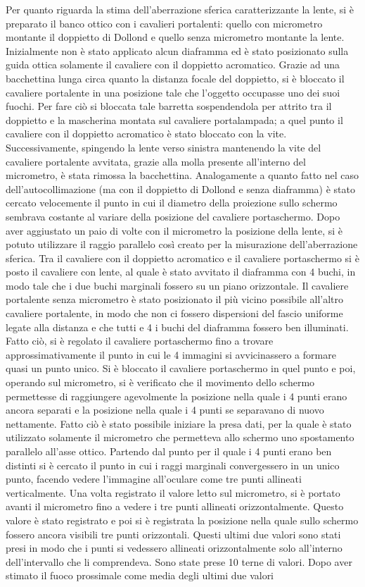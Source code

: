 Per quanto riguarda la stima dell'aberrazione sferica caratterizzante la lente, si è preparato il banco ottico con i cavalieri portalenti: quello con micrometro montante il doppietto di Dollond e quello senza micrometro montante la lente. Inizialmente non è stato applicato alcun diaframma ed è stato posizionato sulla guida ottica solamente il cavaliere con il doppietto acromatico. Grazie ad una bacchettina lunga circa quanto la distanza focale del doppietto, si è bloccato il cavaliere portalente in una posizione tale che l'oggetto occupasse uno dei suoi fuochi. Per fare ciò si bloccata tale barretta sospendendola per attrito tra il doppietto e la mascherina montata sul cavaliere portalampada; a quel punto il cavaliere con il doppietto acromatico è stato bloccato con la vite. Successivamente, spingendo la lente verso sinistra mantenendo la vite del cavaliere portalente avvitata, grazie alla molla presente all'interno del micrometro, è stata rimossa la bacchettina. Analogamente a quanto fatto nel caso dell'autocollimazione (ma con il doppietto di Dollond e senza diaframma) è stato cercato velocemente il punto in cui il diametro della proiezione sullo schermo sembrava costante al variare della posizione del cavaliere portaschermo. Dopo aver aggiustato un paio di volte con il micrometro la posizione della lente, si è potuto utilizzare il raggio parallelo cos\`i creato per la misurazione dell'aberrazione sferica. Tra il cavaliere con il doppietto acromatico e il cavaliere portaschermo si \`e posto il cavaliere con lente, al quale è stato avvitato il diaframma con 4 buchi, in modo tale che i due buchi marginali fossero su un piano orizzontale. Il cavaliere portalente senza micrometro è stato posizionato il più vicino possibile all'altro cavaliere portalente, in modo che non ci fossero dispersioni del fascio uniforme legate alla distanza e che tutti e 4 i buchi del diaframma fossero ben illuminati. Fatto ciò, si è regolato il cavaliere portaschermo fino a trovare approssimativamente il punto in cui le 4 immagini si avvicinassero a formare quasi un punto unico. Si è bloccato il cavaliere portaschermo in quel punto e poi, operando sul micrometro, si è verificato che il movimento dello schermo permettesse di raggiungere agevolmente la posizione nella quale i 4 punti erano ancora separati e la posizione nella quale i 4 punti se separavano di nuovo nettamente. Fatto ciò è stato possibile iniziare la presa dati, per la quale è stato utilizzato solamente il micrometro che permetteva allo schermo uno spostamento parallelo all'asse ottico. Partendo dal punto per il quale i 4 punti erano ben distinti si è cercato il punto in cui i raggi marginali convergessero in un unico punto, facendo vedere l'immagine all'oculare come tre punti allineati verticalmente. Una volta registrato il valore letto sul micrometro, si è portato avanti il micrometro fino a vedere i tre punti allineati orizzontalmente. Questo valore è stato registrato e poi si è registrata la posizione nella quale sullo schermo fossero ancora visibili tre punti orizzontali. Questi ultimi due valori sono stati presi in modo che i punti si vedessero allineati orizzontalmente solo all'interno dell'intervallo che li comprendeva. Sono state prese 10 terne di valori. Dopo aver stimato il fuoco prossimale come media degli ultimi due valori 